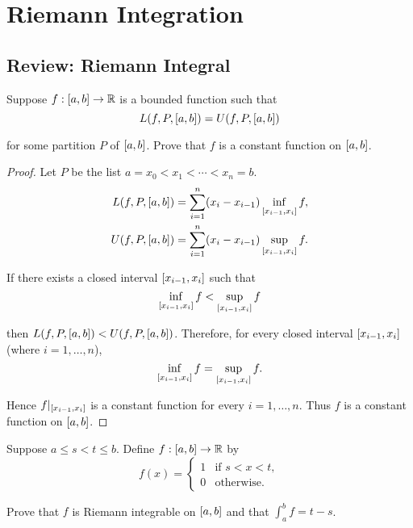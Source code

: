 \chapter{Riemann Integration}

\section{Review: Riemann Integral}

\begin{exercise}\label{chapter1:sectionA:exercise1}
    Suppose $f: \left[{a,b}\right]\to\mathbb{R}$ is a bounded function such that
    \[
        L(f, P, \left[{a, b}\right]) = U(f, P, \left[{a, b}\right])
    \]

    for some partition $P$ of $\left[{a,b}\right]$. Prove that $f$ is a constant function on $\left[{a, b}\right]$.
\end{exercise}

\begin{proof}
    Let $P$ be the list $a = x_{0} < x_{1} < \cdots < x_{n} = b$.
    \begin{align*}
        L(f, P, \left[{a, b}\right]) & = \sum^{n}_{i=1}(x_{i} - x_{i-1})\inf\limits_{\left[{x_{i-1}, x_{i}}\right]}f, \\
        U(f, P, \left[{a, b}\right]) & = \sum^{n}_{i=1}(x_{i} - x_{i-1})\sup\limits_{\left[{x_{i-1}, x_{i}}\right]}f.
    \end{align*}

    If there exists a closed interval $\left[{x_{i-1}, x_{i}}\right]$ such that
    \[
        \inf\limits_{\left[{x_{i-1}, x_{i}}\right]}f < \sup\limits_{\left[{x_{i-1}, x_{i}}\right]}f
    \]

    then $L(f, P, \left[{a,b}\right]) < U(f, P, \left[{a, b}\right])$. Therefore, for every closed interval $\left[{x_{i-1}, x_{i}}\right]$ (where $i=1,\ldots,n$),
    \[
        \inf\limits_{\left[{x_{i-1}, x_{i}}\right]}f = \sup\limits_{\left[{x_{i-1}, x_{i}}\right]}f.
    \]

    Hence $f\vert_{\left[{x_{i-1}, x_{i}}\right]}$ is a constant function for every $i = 1,\ldots,n$. Thus $f$ is a constant function on $\left[{a,b}\right]$.
\end{proof}
\newpage

\begin{exercise}\label{chapter1:sectionA:exercise2}
    Suppose $a\leq s < t\leq b$. Define $f: \left[{a, b}\right]\to\mathbb{R}$ by
    \[
        f(x) = \begin{cases}
            1 & \text{if $s < x < t$}, \\
            0 & \text{otherwise.}
        \end{cases}
    \]

    Prove that $f$ is Riemann integrable on $\left[{a, b}\right]$ and that $\int^{b}_{a}f = t - s$.
\end{exercise}

